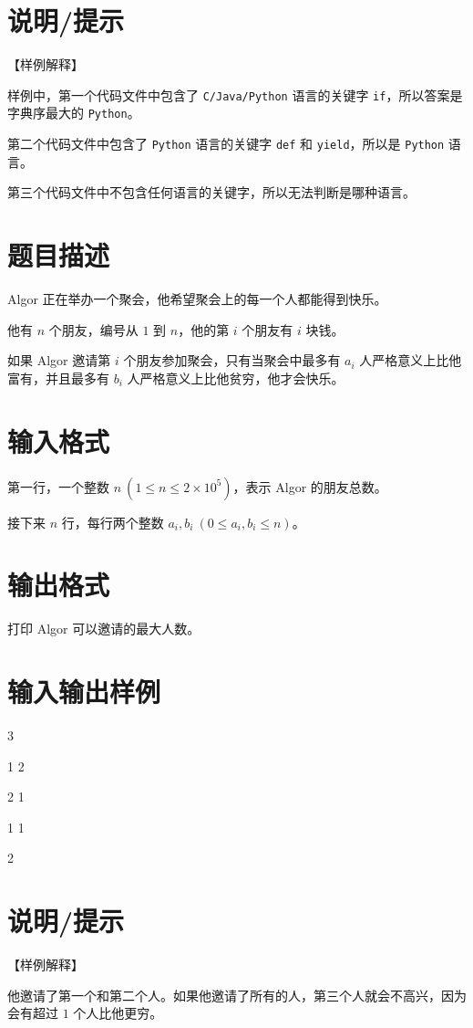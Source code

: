 \documentclass{../cpct/ctpro}
\begin{document}
\section*{说明/提示}

【样例解释】

样例中，第一个代码文件中包含了 \texttt{C/Java/Python} 语言的关键字 \texttt{if}，所以答案是字典序最大的 \texttt{Python}。

第二个代码文件中包含了 \texttt{Python} 语言的关键字 \texttt{def} 和 \texttt{yield}，所以是 \texttt{Python} 语言。

第三个代码文件中不包含任何语言的关键字，所以无法判断是哪种语言。

\makeproblem
\section*{题目描述}

Algor 正在举办一个聚会，他希望聚会上的每一个人都能得到快乐。

他有 $n$ 个朋友，编号从 $1$ 到 $n$，他的第 $i$ 个朋友有 $i$ 块钱。

如果 Algor 邀请第 $i$ 个朋友参加聚会，只有当聚会中最多有 $a_i$ 人严格意义上比他富有，并且最多有 $b_i$ 人严格意义上比他贫穷，他才会快乐。

\section*{输入格式}

第一行，一个整数 $n~(1 \leq n \leq 2 \times {10}^{5})$，表示 Algor 的朋友总数。

接下来 $n$ 行，每行两个整数 $a_i,b_i~(0 \leq a_i,b_i \leq n)$。

\section*{输出格式}

打印 Algor 可以邀请的最大人数。

\section*{输入输出样例}
\testcasetab
{
    3\par
    1 2\par
    2 1\par
    1 1
}
{
    2
}

\section*{说明/提示}

【样例解释】

他邀请了第一个和第二个人。如果他邀请了所有的人，第三个人就会不高兴，因为会有超过 $1$ 个人比他更穷。
\end{document}
